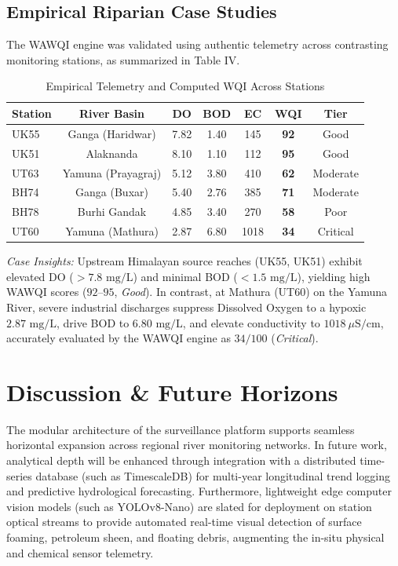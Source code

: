 \documentclass[conference]{IEEEtran}
\begin{document}
\subsection{Empirical Riparian Case Studies}
The WAWQI engine was validated using authentic telemetry across contrasting monitoring stations, as summarized in Table IV.

\begin{table}[htbp]
\caption{Empirical Telemetry and Computed WQI Across Stations}
\begin{center}
\begin{tabular}{lcccccc}
\toprule
\textbf{Station} & \textbf{River Basin} & \textbf{DO} & \textbf{BOD} & \textbf{EC} & \textbf{WQI} & \textbf{Tier} \\
\midrule
UK55 & Ganga (Haridwar) & 7.82 & 1.40 & 145 & \textbf{92} & Good \\
UK51 & Alaknanda & 8.10 & 1.10 & 112 & \textbf{95} & Good \\
UT63 & Yamuna (Prayagraj) & 5.12 & 3.80 & 410 & \textbf{62} & Moderate \\
BH74 & Ganga (Buxar) & 5.40 & 2.76 & 385 & \textbf{71} & Moderate \\
BH78 & Burhi Gandak & 4.85 & 3.40 & 270 & \textbf{58} & Poor \\
UT60 & Yamuna (Mathura) & 2.87 & 6.80 & 1018 & \textbf{34} & Critical \\
\bottomrule
\end{tabular}
\end{center}
\end{table}

\textit{Case Insights:} Upstream Himalayan source reaches (UK55, UK51) exhibit elevated DO ($> 7.8\text{ mg/L}$) and minimal BOD ($< 1.5\text{ mg/L}$), yielding high WAWQI scores ($92$--$95$, \textit{Good}). In contrast, at Mathura (UT60) on the Yamuna River, severe industrial discharges suppress Dissolved Oxygen to a hypoxic $2.87\text{ mg/L}$, drive BOD to $6.80\text{ mg/L}$, and elevate conductivity to $1018\ \mu\text{S/cm}$, accurately evaluated by the WAWQI engine as $34/100$ (\textit{Critical}).

\section{Discussion \& Future Horizons}
The modular architecture of the surveillance platform supports seamless horizontal expansion across regional river monitoring networks. In future work, analytical depth will be enhanced through integration with a distributed time-series database (such as TimescaleDB) for multi-year longitudinal trend logging and predictive hydrological forecasting. Furthermore, lightweight edge computer vision models (such as YOLOv8-Nano) are slated for deployment on station optical streams to provide automated real-time visual detection of surface foaming, petroleum sheen, and floating debris, augmenting the in-situ physical and chemical sensor telemetry.
\end{document}
